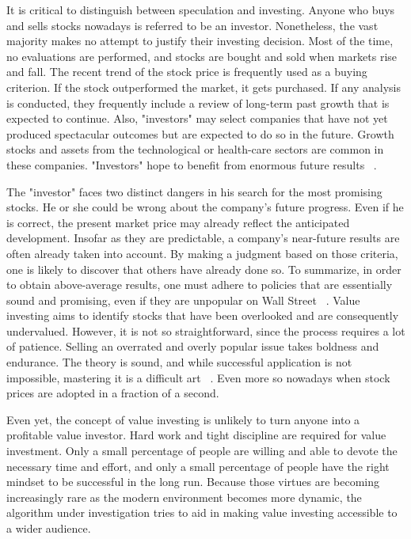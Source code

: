 \documentclass{imc-inf}
\begin{document}
It is critical to distinguish between speculation and investing. Anyone who buys and sells stocks nowadays is referred to be an investor. Nonetheless, the vast majority makes no attempt to justify their investing decision. Most of the time, no evaluations are performed, and stocks are bought and sold when markets rise and fall. The recent trend of the stock price is frequently used as a buying criterion. If the stock outperformed the market, it gets purchased. If any analysis is conducted, they frequently include a review of long-term past growth that is expected to continue. Also, "investors" may select companies that have not yet produced spectacular outcomes but are expected to do so in the future. Growth stocks and assets from the technological or health-care sectors are common in these companies. "Investors" hope to benefit from enormous future results ~\cite{the_intelligent_investor}. 

The "investor" faces two distinct dangers in his search for the most promising stocks. He or she could be wrong about the company's future progress. Even if he is correct, the present market price may already reflect the anticipated development. Insofar as they are predictable, a company's near-future results are often already taken into account. By making a judgment based on those criteria, one is likely to discover that others have already done so. To summarize, in order to obtain above-average results, one must adhere to policies that are essentially sound and promising, even if they are unpopular on Wall Street ~\cite{the_intelligent_investor}.
Value investing aims to identify stocks that have been overlooked and are consequently undervalued. However, it is not so straightforward, since the process requires a lot of patience. Selling an overrated and overly popular issue takes boldness and endurance. The theory is sound, and while successful application is not impossible, mastering it is a difficult art ~\cite{the_intelligent_investor}. Even more so nowadays when stock prices are adopted in a fraction of a second.

Even yet, the concept of value investing is unlikely to turn anyone into a profitable value investor. Hard work and tight discipline are required for value investment. Only a small percentage of people are willing and able to devote the necessary time and effort, and only a small percentage of people have the right mindset to be successful in the long run. Because those virtues are becoming increasingly rare as the modern environment becomes more dynamic, the algorithm under investigation tries to aid in making value investing accessible to a wider audience.
\end{document}
